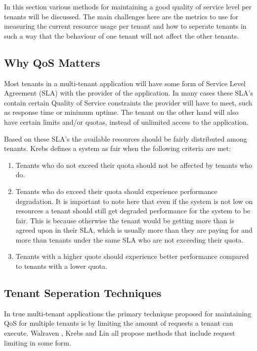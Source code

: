 In this section various methods for maintaining a good quality of service level per tenants will be discussed.
The main challenges here are the metrics to use for measuring the current resource usage per tenant and how to seperate tenants in such a way that the behaviour of one tenant will not affect the other tenants.\cite{krebs2013metrics}

\subsection{Why QoS Matters}
Most tenants in a multi-tenant application will have some form of Service Level Agreement (SLA) with the provider of the application.
In many cases these SLA's contain certain Quality of Service constraints the provider will have to meet, such as response time or minimum uptime. 
The tenant on the other hand will also have certain limits and/or quotas, instead of unlimited access to the application.

Based on these SLA's the available resources should be fairly distributed among tenants.
Krebs\cite{krebs2013metrics} defines a system as fair when the following criteria are met:
\begin{enumerate}
	\item Tenants who do not exceed their quota should not be affected by tenants who do.
	\item Tenants who do exceed their quota should experience performance degradation. 
		It is important to note here that even if the system is not low on resources a tenant should still get degraded performance for the system to be fair.
		This is because otherwise the tenant would be getting more than is agreed upon in their SLA, which is usually more than they are paying for and more than tenants under the same SLA who are not exceeding their quota.
	\item Tenants with a higher quote should experience better performance compared to tenants with a lower quota.
\end{enumerate}

\subsection{Tenant Seperation Techniques}
In true multi-tenant applications the primary technique proposed for maintaining QoS for multiple tenants is by limiting the amount of requests a tenant can execute. Walraven \cite{walraven2012towards}, Krebs \cite{krebs2013metrics} and Lin \cite{lin2009feedback} all propose methods that include request limiting in some form.

